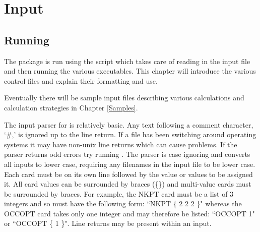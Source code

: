 \documentclass[11pt]{report}
\begin{document}
\chapter{Input}
\section{Running \OCEAN}

The \OCEAN{} package is run using the  script  which takes care of reading in the input file and then running the various executables. This chapter will introduce the various control files and explain their formatting and use.

Eventually there will be sample input files describing various calculations and calculation strategies in Chapter \ref{Samples}.

The input parser for \OCEAN{} is relatively basic. Any text following a comment character, `\#,' is ignored up to the line return. If a file has been switching around operating systems it may have non-unix line returns which can cause problems. If the parser returns odd errors try running . The parser is case ignoring and converts all inputs to lower case, requiring any filenames in the input file to be lower case. Each card must be on its own line followed by the value or values to be assigned it. All card values can be surrounded by braces (\{\}) and multi-value cards must be surrounded by braces. For example, the NKPT card must be a list of 3 integers and so must have the following form: ``NKPT \{ 2 2 2 \}" whereas the OCCOPT card takes only one integer and may therefore be listed: ``OCCOPT 1" or ``OCCOPT \{ 1 \}". Line returns may be present within an input. 
\end{document}
